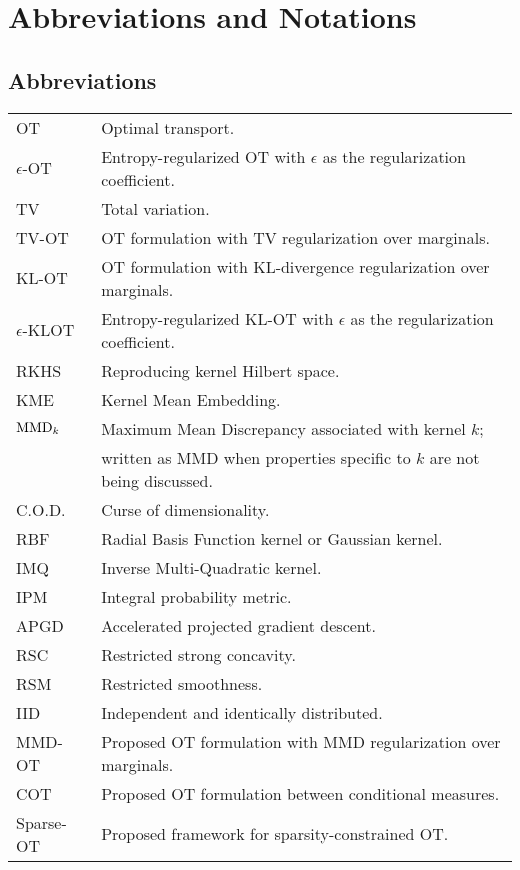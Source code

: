 \chapter*{Abbreviations and Notations}\label{notn}
\section*{Abbreviations}
\vspace{0.25in}
\begin{tabular}{@{}l  p{125mm}@{}}
OT & Optimal transport.\\
$\epsilon$-OT & Entropy-regularized OT with $\epsilon$ as the regularization coefficient.\\
TV & Total variation.\\
TV-OT & OT formulation with TV regularization over marginals.\\
KL-OT & OT formulation with KL-divergence regularization over marginals.\\
$\epsilon$-KLOT & Entropy-regularized KL-OT with $\epsilon$ as the regularization coefficient.\\
RKHS & Reproducing kernel Hilbert space.\\
KME & Kernel Mean Embedding.\\
$\textup{MMD}_k$ & Maximum Mean Discrepancy associated with kernel $k$;\\
& written as MMD when properties specific to $k$ are not being discussed.\\
C.O.D. & Curse of dimensionality.\\
RBF & Radial Basis Function kernel or Gaussian kernel.\\
IMQ & Inverse Multi-Quadratic kernel.\\
IPM & Integral probability metric.\\
APGD & Accelerated projected gradient descent.\\
RSC & Restricted strong concavity.\\
RSM & Restricted smoothness.\\
IID & Independent and identically distributed.\\
MMD-OT & Proposed OT formulation with MMD regularization over marginals.\\
COT & Proposed OT formulation between conditional measures.\\
Sparse-OT & Proposed framework for sparsity-constrained OT.\\
\end{tabular}

